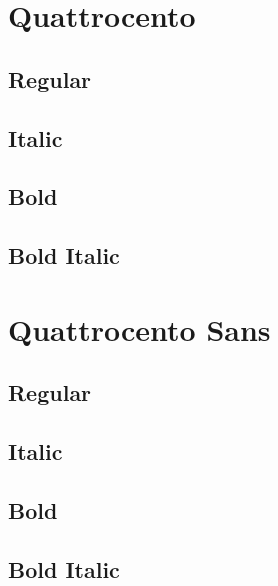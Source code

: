 \documentclass{article}
\begin{document}
\section{Quattrocento}
\subsection*{Regular}
\lipsum[1]

\subsection*{Italic}
\textit{\lipsum[2]}


\subsection*{Bold}
\textbf{\lipsum[3]}

\subsection*{Bold Italic}

\textbf{\textit{\lipsum[4]}}

\section{Quattrocento Sans}\sf

\subsection*{Regular}
\lipsum[1]

\subsection*{Italic}
\textit{\lipsum[2]}

\subsection*{Bold}
\textbf{\lipsum[3]}

\subsection*{Bold Italic}

\textbf{\textit{\lipsum[4]}}
\end{document}
